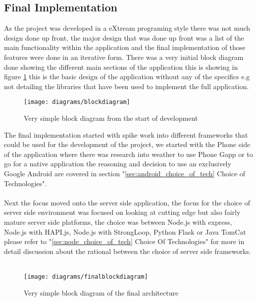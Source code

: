 \subsection{Final Implementation}

As the project was developed in a eXtream programing style there was not much design done up front, the major design that was done up front was a list of the main functionality within the application and the final implementation of those features were done in an iterative form. There was a very initial block diagram done showing the different main sections of the application this is showing in figure \ref{fig:initial_diagram_image} this is the basic design of the application without any of the specifics e.g not detailing the libraries that have been used to implement the full application.\\

\begin{figure}[htb!]
    \centering
    \texttt{[image: diagrams/blockdiagram]}
    \caption{Very simple block diagram from the start of development}
    \label{fig:initial_diagram_image}
\end{figure} 

\noindent
The final implementation started with spike work into different frameworks that could be used for the development of the project, we started with the Phone side of the application where there was research into weather to use Phone Gapp or to go for a native application the reasoning and decision to use an exclusively Google Android are covered in section "\ref{sec:android_choice_of_tech} Choice of Technologies".\\
\\
Next the focus moved onto the server side application, the focus for the choice of server side environment was focused on looking at cutting edge but also fairly mature server side platforms, the choice was between Node.js with express, Node.js with HAPI.js, Node.js with StrongLoop, Python Flask or Java TomCat please refer to "\ref{sec:node_choice_of_tech} Choice Of Technologies" for more in detail discussion about the rational between the choice of server side frameworks.\\
\\


\begin{figure}[htb!]
    \centering
    \texttt{[image: diagrams/finalblockdiagram]}
    \caption{Very simple block diagram of the final architecture}
    \label{fig:final_block_diagram_image}
\end{figure} 
\noindent


